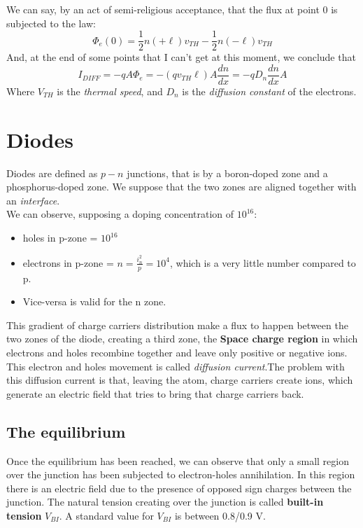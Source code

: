 \documentclass[12pt]{article}
\newcommand{\B}{\textbf}
\newcommand{\I}{\textit}
\newcommand{\bite}{\begin{itemize}} %
\newcommand{\fite}{\end{itemize}}   %
\begin{document}
We can say, by an act of semi-religious acceptance, that the flux at point 0 is subjected to the law:
\begin{equation}
\Phi_e(0) = \frac{1}{2}n(+\ell)v_{TH}-\frac{1}{2}n(-\ell)v_{TH}
\end{equation}
And, at the end of some points that I can't get at this moment, we conclude that
\begin{equation}
I_{DIFF} = -qA\Phi_e= -(qv_{TH}\ell)A\frac{dn}{dx} = -qD_n\frac{dn}{dx}A
\end{equation}
Where $V_{TH}$ is the \I{thermal speed}, and $D_n$ is the \I{diffusion constant} of the electrons.

\section{Diodes}

Diodes are defined as $p-n$ junctions, that is by a boron-doped zone and a phosphorus-doped zone. We suppose that the two zones are aligned together with an \I{interface}. \\
We can observe, supposing a doping concentration of $10^{16}$:
\bite
	\item holes in p-zone = $10^{16}$
	\item electrons in p-zone = $n = \frac{i_n^2}{p} = 10^4$, which is a very little number compared to p.
	\item Vice-versa is valid for the n zone.
\fite
This gradient of charge carriers distribution make a flux to happen between the two zones of the diode, creating a third zone, the \B{Space charge region} in which electrons and holes recombine together and leave only positive or negative ions. This electron and holes movement is called \I{diffusion current}.The problem with this diffusion current is that, leaving the atom, charge carriers create ions, which generate an electric field that tries to bring that charge carriers back. 
\subsection{The equilibrium}
Once the equilibrium has been reached, we can observe that only a small region over the junction has been subjected to electron-holes annihilation. In this region there is an electric field  due to the presence of opposed sign charges between the junction. The natural tension creating over the junction is called  \B{built-in tension} $V_{BI}$. A standard value for $V_{BI}$ is between 0.8/0.9 V.
\end{document}
